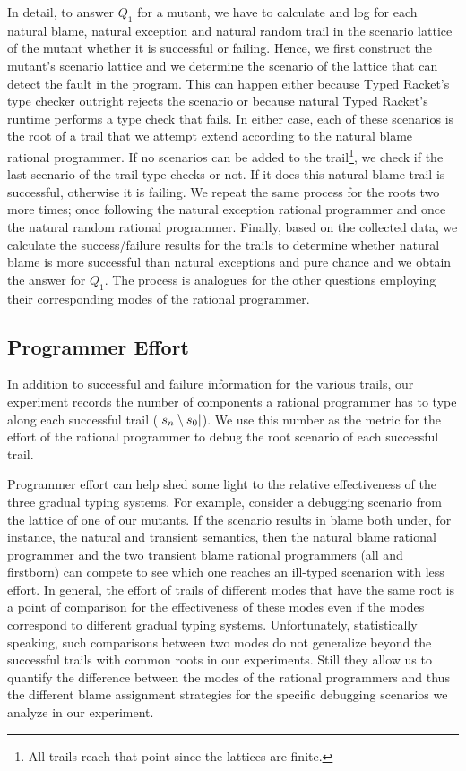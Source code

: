 
In detail, to answer $Q_1$ for a mutant, we have to 
calculate and log for each natural blame, natural exception and natural
random trail 
in the scenario lattice of the mutant whether it is successful or failing. 
Hence, we first construct the mutant's scenario
lattice and we determine the scenario of the lattice that can detect the fault in the
program. This can happen either because Typed Racket's type checker
outright rejects the scenario or because natural Typed Racket's runtime 
performs a type check that fails. In either
case,  each of these scenarios is the root of a trail that we attempt
extend according to the natural blame rational programmer. 
If no scenarios can be added to the trail\footnote{All trails
reach that point since the lattices are finite.}, we check if the
last scenario of the trail type checks or not. If it does this
natural blame trail
is successful, otherwise it is failing. We repeat the same process for the
roots two more times; once following the natural exception rational programmer and 
once the natural random rational programmer. Finally, based on the
collected data, we
calculate the success/failure results for the trails to determine whether
 natural blame is more successful than  natural exceptions and pure chance
 and we obtain the answer for $Q_1$.
The process is analogues for the other questions employing their corresponding
modes of the rational programmer. 


\subsection{Programmer Effort}

In addition to successful and failure information for the various trails,  
our experiment  records the number of components a rational programmer 
has to type along each successful trail ($\lvert s_n \setminus s_0
\rvert$). We use this number as the metric for the effort 
of the rational programmer to debug the root scenario of each successful trail.  

Programmer effort can help shed some light to the relative effectiveness of the
three gradual typing systems. For example, consider a debugging scenario from  the
lattice of one of our mutants.  If the
scenario results in blame both under, for instance, the natural and transient semantics,
then the natural blame rational programmer and the two transient blame
rational programmers (all and firstborn) can compete to see which one
reaches an ill-typed scenarion with less effort. In
general, the effort of trails of different modes that have the same
root is a point of comparison for the effectiveness of these
modes even if the modes correspond to different gradual typing systems.
Unfortunately, statistically speaking, such comparisons between two modes do not generalize 
beyond the successful trails with common roots in our experiments.
Still they allow us to quantify the difference between the modes of the rational
programmers and thus the different blame assignment strategies  for the specific
debugging scenarios we analyze in our experiment.

